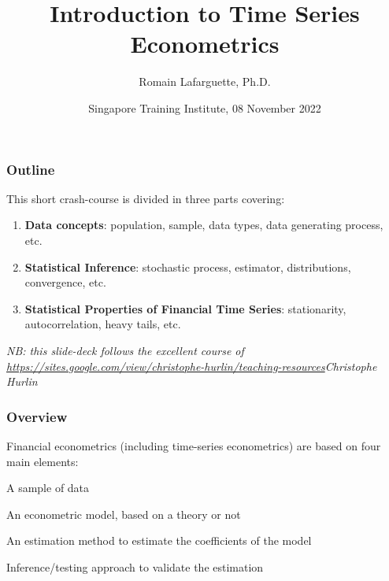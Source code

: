 \documentclass{beamer}
\title[Concepts]{Introduction to Time Series Econometrics}
\author[R. Lafarguette]{Romain Lafarguette, Ph.D.}
\institute[IMF]{Quant \& IMF External Consultant}
\date[STI, 08 Nov 2022]{Singapore Training Institute, 08 November 2022}
\newenvironment{wideenumerate}{\enumerate\addtolength{\itemsep}{10pt}}{\endenumerate}
\begin{document}
\begingroup
\renewcommand{\insertframenumber}{}
\begin{frame}
\maketitle
\end{frame}
\endgroup


\begin{frame}
  \frametitle{Outline}

  This short crash-course is divided in three parts covering:\\
  \smallskip
  
  \begin{enumerate}
  \item \textbf{Data concepts}: population, sample, data types, data generating process, etc.
  \item \textbf{Statistical Inference}: stochastic process, estimator, distributions, convergence, etc.
  \item \textbf{Statistical Properties of Financial Time Series}: stationarity, autocorrelation, heavy tails, etc.
  \end{enumerate}


\smallskip
\emph{NB: this slide-deck follows the excellent course of \url{https://sites.google.com/view/christophe-hurlin/teaching-resources}{Christophe Hurlin}}  
\end{frame}




\begin{frame}
  \frametitle{Overview}

Financial econometrics (including time-series econometrics) are based on four main elements:\\
\smallskip

  \begin{wideenumerate}
    \item A sample of data
    \item An econometric model, based on a theory or not
    \item An estimation method to estimate the coefficients of the model
    \item Inference/testing approach to validate the estimation
  \end{wideenumerate}
  
\end{frame}
\end{document}
